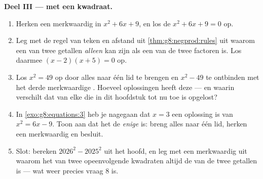 \begin{problem}[{Weekendopgave --- $(a+b)^2$, $(a-b)^2$,
$(a+b)(a-b)$, en de som $1 + 3 + 5 + \dots + (2n-1) = n^2$}]
\medskip
\noindent\textbf{Deel III ---  met een kwadraat.}
\begin{enumerate}[resume]
  \item Herken een merkwaardig  in $x^2 + 6x + 9$, en los de 
        $x^2 + 6x + 9 = 0$ op.
  \item Leg met de regel van teken en afstand uit \cref{thm:g8:negprod:rules}
        uit waarom een  van twee getallen \emph{alleen}  kan zijn als
        een van de twee factoren  is. Los daarmee $(x - 2)(x + 5) = 0$ op.
  \item Los $x^2 = 49$ op door alles naar één lid te brengen en $x^2 - 49$ te
        ontbinden met het derde merkwaardige . Hoeveel oplossingen heeft
        deze  --- en waarin verschilt dat van elke  die
        in dit hoofdstuk tot nu toe is opgelost?
  \item In \cref{exo:g8:equations:3} heb je nagegaan dat $x = 3$ een oplossing
        is van $x^2 = 6x - 9$. Toon aan dat het de \emph{enige} is: breng alles
        naar één lid, herken een merkwaardig  en besluit.
  \item Slot: bereken $2026^2 - 2025^2$ uit het hoofd, en leg met een
        merkwaardig  uit waarom het  van twee opeenvolgende
        kwadraten altijd de  van de twee getallen is --- wat weer precies
        vraag 8 is.
\end{enumerate}
\end{problem}
